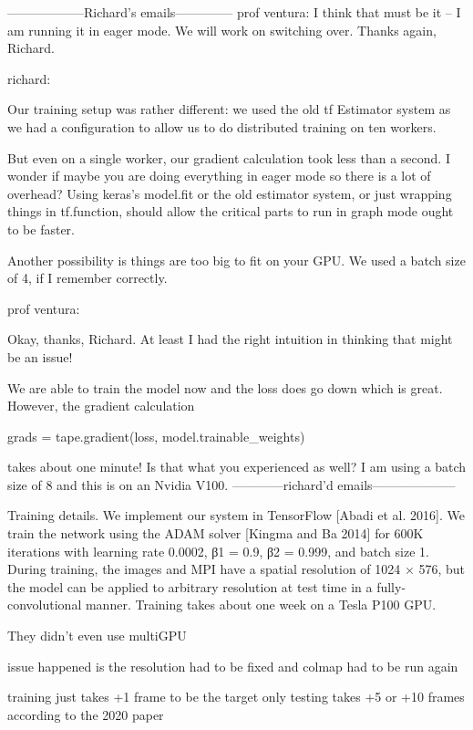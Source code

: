 ------------------Richard's emails--------------
prof ventura:
I think that must be it – I am running it in eager mode.  We will work on switching over.  Thanks again, Richard.


richard:

Our training setup was rather different: we used the old tf Estimator system as we had a configuration to allow us to do distributed training on ten workers.

 

But even on a single worker, our gradient calculation took less than a second. I wonder if maybe you are doing everything in eager mode so there is a lot of overhead? Using keras's model.fit or the old estimator system, or just wrapping things in tf.function, should allow the critical parts to run in graph mode ought to be faster.

Another possibility is things are too big to fit on your GPU. We used a batch size of 4, if I remember correctly.


prof ventura:

Okay, thanks, Richard.  At least I had the right intuition in thinking that might be an issue!

 

We are able to train the model now and the loss does go down which is great.  However, the gradient calculation

 

grads = tape.gradient(loss, model.trainable_weights)

 

takes about one minute!  Is that what you experienced as well?  I am using a batch size of 8 and this is on an Nvidia V100.
------------richard'd emails--------------------

Training details. We implement our system in TensorFlow [Abadi
et al. 2016]. We train the network using the ADAM solver [Kingma
and Ba 2014] for 600K iterations with learning rate 0.0002, β1 =
0.9, β2 = 0.999, and batch size 1. During training, the images and
MPI have a spatial resolution of 1024 × 576, but the model can be
applied to arbitrary resolution at test time in a fully-convolutional
manner. Training takes about one week on a Tesla P100 GPU.

They didn't even use multiGPU

issue happened is the resolution had to be fixed and colmap had to be run again

training just takes +1 frame to be the target
only testing takes +5 or +10 frames according to the 2020 paper




